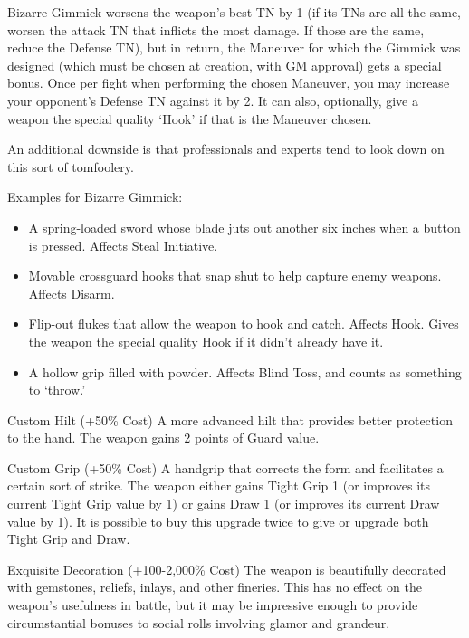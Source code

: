 \documentclass[oneside,11pt,english]{book}
\begin{document}
 

Bizarre Gimmick worsens the weapon’s best TN by 1 (if its TNs are all the same, worsen the attack TN 
that inflicts the most damage. If those are the same, reduce the Defense TN), but in return, the Maneuver 
for which the Gimmick was designed (which must be chosen at creation, with GM approval) gets a 
special bonus. Once per fight when performing the chosen Maneuver, you may increase your opponent’s 
Defense TN against it by 2. It can also, optionally, give a weapon the special quality ‘Hook’ if that is the 
Maneuver chosen. 

 

An additional downside is that professionals and experts tend to look down on this sort of tomfoolery. 

 

Examples for Bizarre Gimmick:
\begin{itemize} 
\item A spring-loaded sword whose blade juts out another six inches when a button is pressed. Affects 
Steal Initiative. 
\item Movable crossguard hooks that snap shut to help capture enemy weapons. Affects Disarm. 
\item Flip-out flukes that allow the weapon to hook and catch. Affects Hook. Gives the weapon the 
special quality Hook if it didn’t already have it. 
\item A hollow grip filled with powder. Affects Blind Toss, and counts as something to ‘throw.’ 
\end{itemize}
 

Custom Hilt (+50\% Cost) 
A more advanced hilt that provides better protection to the hand. The weapon gains 2 points of Guard 
value. 

 

Custom Grip (+50\% Cost) 
A handgrip that corrects the form and facilitates a certain sort of strike. The weapon either gains Tight 
Grip 1 (or improves its current Tight Grip value by 1) or gains Draw 1 (or improves its current Draw 
value by 1). It is possible to buy this upgrade twice to give or upgrade both Tight Grip and Draw. 

 

Exquisite Decoration (+100-2,000\% Cost) 
The weapon is beautifully decorated with gemstones, reliefs, inlays, and other fineries. This has no effect 
on the weapon’s usefulness in battle, but it may be impressive enough to provide circumstantial bonuses 
to social rolls involving glamor and grandeur. 
\end{document}
